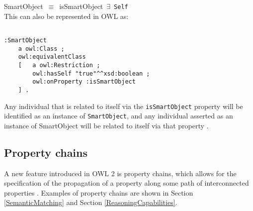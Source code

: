\noindent
SmartObject~\ensuremath{\equiv}~isSmartObject~\ensuremath{\exists}~\texttt{Self}\\

This can also be represented in \ac{OWL} as:

\begin{verbatim}

:SmartObject
    a owl:Class ;
    owl:equivalentClass
    [   a owl:Restriction ;
        owl:hasSelf "true"^^xsd:boolean ;
        owl:onProperty :isSmartObject
    ] .
\end{verbatim}


Any individual that is related to itself via the \texttt{isSmartObject} property will be identified as an instance of \texttt{SmartObject}, and any individual asserted as an instance of SmartObject will be related to itself via that property \cite{Hoekstra2010}.


\subsection{Property chains}

A new feature introduced in \ac{OWL} 2 is property chains, which allows for the specification of the propagation of a property along some path of interconnected properties \cite{Hoekstra2008}. Examples of property chains are shown in Section \ref{SemanticMatching} and Section \ref{ReasoningCapabilities}.


% 
% 
% 
% 
% 
% 
% 
% 
% 


